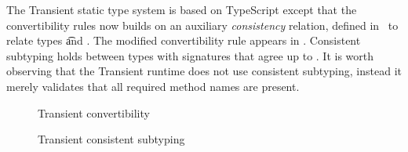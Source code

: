 \documentclass[acmlarge, anonymous, authordraft, review]{acmart} %
\begin{document}
The Transient static type system is based on TypeScript except that the
convertibility rules now builds on an auxiliary \emph{consistency} relation,
defined in~ to relate types \t and \tp. The modified
convertibility rule appears in . Consistent subtyping holds
between types with signatures that agree up to \any.  It is worth observing
that the Transient runtime does not use consistent subtyping, instead
it merely validates that all required method names are present.

\begin{figure}[!t]
\hrulefill
\vspace{-4mm}

\begin{mathpar}
\end{mathpar}
\vspace{-6mm}

\hrulefill
\caption{Transient convertibility}\label{convtp}


\hrulefill
\small\vspace{-4mm}

\begin{mathpar} 





\end{mathpar}

\hrulefill
\caption{Transient consistent subtyping}\label{subtp}

\hrulefill
\vspace{1mm}


\end{figure}
\end{document}
